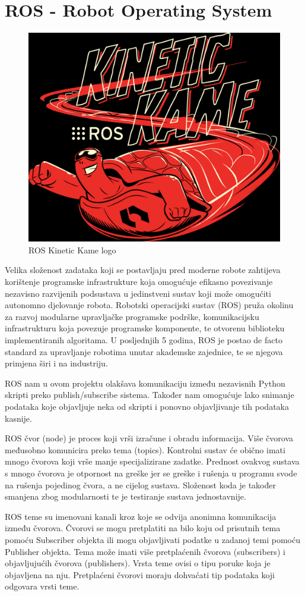 \documentclass[times, utf8, diplomski]{fer}
\begin{document}
\section{ROS - Robot Operating System}
\begin{figure}[h]
\centering
\includegraphics[width=.45\textwidth]{ros_kinetic}
\caption{ROS Kinetic Kame logo}
\label{fig:ros_kin}
\end{figure}
Velika složenost zadataka koji se postavljaju pred moderne robote zahtijeva korištenje programske infrastrukture koja omogućuje efikasno povezivanje nezavisno razvijenih podsustava u jedinstveni sustav koji može omogućiti autonomno djelovanje robota. Robotski operacijski sustav (ROS) pruža okolinu za razvoj modularne upravljačke programske podrške, komunikacijsku infrastrukturu koja povezuje programske komponente, te otvorenu biblioteku implementiranih algoritama. U posljednjih 5 godina, ROS je postao de facto standard za upravljanje robotima unutar akademske zajednice, te se njegova primjena širi i na industriju.

ROS nam u ovom projektu olakšava komunikaciju između nezavisnih Python skripti preko publish/subscribe sistema. Također nam omogućuje lako snimanje podataka koje objavljuje neka od skripti i ponovno objavljivanje tih podataka kasnije.

ROS čvor (node) je proces koji vrši izračune i obradu informacija. Više čvorova međusobno komunicira preko tema (topics). Kontrolni sustav će obično imati mnogo čvorova koji vrše manje specijalizirane zadatke. Prednost ovakvog sustava s mnogo čvorova je otpornost na greške jer se greške i rušenja u programu svode na rušenja pojedinog čvora, a ne cijelog sustava. Složenost koda je također smanjena zbog modularnosti te je testiranje sustava jednostavnije.

ROS teme su imenovani kanali kroz koje se odvija anonimna komunikacija između čvorova. Čvorovi se mogu pretplatiti na bilo koju od prisutnih tema pomoću Subscriber objekta ili mogu objavljivati podatke u zadanoj temi pomoću Publisher objekta. Tema može imati više pretplaćenih čvorova (subscribers) i objavljujućih čvorova (publishers). Vrsta teme ovisi o tipu poruke koja je objavljena na nju. Pretplaćeni čvorovi moraju dohvaćati tip podataka koji odgovara vrsti teme.
\end{document}
